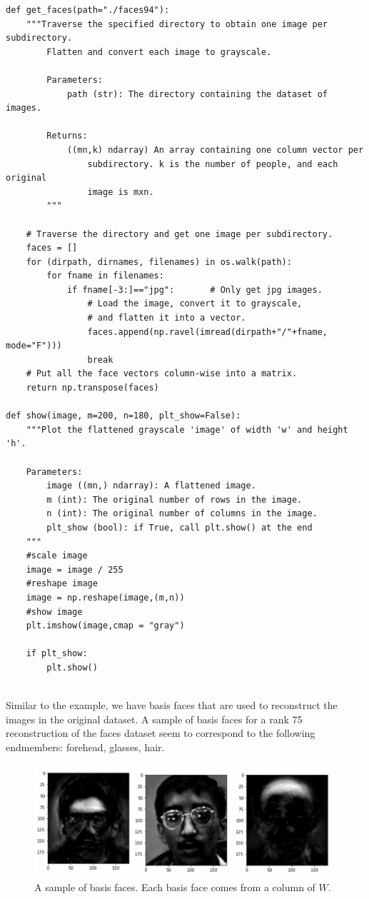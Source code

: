\begin{lstlisting}
def get_faces(path="./faces94"):
    """Traverse the specified directory to obtain one image per subdirectory. 
        Flatten and convert each image to grayscale.
    
        Parameters:
            path (str): The directory containing the dataset of images.  
    
        Returns:
            ((mn,k) ndarray) An array containing one column vector per
                subdirectory. k is the number of people, and each original
                image is mxn.
        """

    # Traverse the directory and get one image per subdirectory.
    faces = []
    for (dirpath, dirnames, filenames) in os.walk(path):
        for fname in filenames:
            if fname[-3:]=="jpg":       # Only get jpg images.
                # Load the image, convert it to grayscale,
                # and flatten it into a vector.
                faces.append(np.ravel(imread(dirpath+"/"+fname, mode="F")))
                break
    # Put all the face vectors column-wise into a matrix.
    return np.transpose(faces)

def show(image, m=200, n=180, plt_show=False):
    """Plot the flattened grayscale 'image' of width 'w' and height 'h'.

    Parameters:
        image ((mn,) ndarray): A flattened image.
        m (int): The original number of rows in the image.
        n (int): The original number of columns in the image.
        plt_show (bool): if True, call plt.show() at the end
    """
    #scale image
    image = image / 255
    #reshape image
    image = np.reshape(image,(m,n))
    #show image
    plt.imshow(image,cmap = "gray")

    if plt_show:
        plt.show()
    
\end{lstlisting}
Similar to the example, we have basis faces that are used to reconstruct the images in the original dataset. 
A sample of basis faces for a rank 75 reconstruction of the faces dataset seem to correspond to the following endmembers: forehead, glasses, hair.

\begin{figure}[H]
\centering
\includegraphics[width=\textwidth]{figures/facial_features.pdf}
\caption{A sample of basis faces.
	      Each basis face comes from a column of $W$.}
\label{fig:basis_faces2}
\end{figure}


